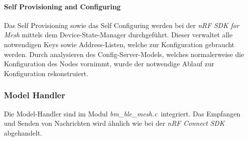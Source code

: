 

\paragraph{Self Provisioning and Configuring}

Das Self Provisioning sowie das Self Configuring werden bei der \textit{nRF SDK for Mesh} mittels dem Device-State-Manager durchgeführt. Dieser verwaltet alle notwendigen Keys sowie Address-Listen, welche zur Konfiguration gebraucht werden. Durch analysieren des Config-Server-Models, welches normalerweise die Konfiguration des Nodes vornimmt, wurde der notwendige Ablauf zur Konfiguration rekonstruiert. 

\subsubsection{Model Handler}\label{subsubsec:BluetoothMeshUmsetzungnRFSDKModelHandler}

Die Model-Handler sind im Modul \textit{bm\_ble\_mesh.c}\footnotemark\ integriert. Das Empfangen und Senden von Nachrichten wird ähnlich wie bei der \textit{nRF Connect SDK} abgehandelt. 
